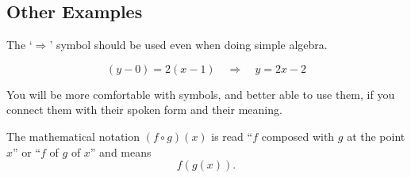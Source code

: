 \subsection*{Other Examples}

The `$\Rightarrow$' symbol should be used even when doing simple algebra.\\
\begin{goodexample}
\[
(y-0)=2(x-1) \quad \Longrightarrow \quad y=2x-2
\]    
\end{goodexample}

You will be more comfortable with symbols, and better able to use them,
if you connect them with their spoken form and their meaning.\\
\begin{goodexample}
The mathematical notation $(f \circ g)(x)$ is read ``$f$ composed with
$g$ at the point $x$'' or ``$f$ of $g$ of $x$'' and means
\[
f(g(x)).
\]
\end{goodexample}
    
      

